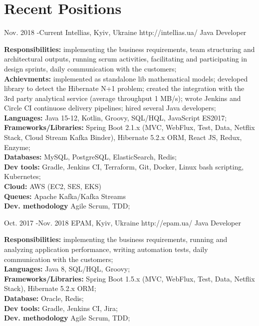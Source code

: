 \documentclass[10pt]{article} %
\begin{document}
\section{Recent Positions}
\job
{Nov. 2018 -}{Current}
{Intellias, Kyiv, Ukraine}
{http://intellias.ua/}
{Java Developer}
{\rule{0mm}{5mm}
\textbf{Responsibilities:}  implementing the business requirements, team structuring and architectural outputs, running scrum activities, facilitating and participating in design sprints, daily communication with the customers;
\\ \textbf{Achievments:} \newline
implemented as standalone lib mathematical models; \newline
 developed library to detect the Hibernate N+1 problem; \newline
 created the integration with the 3rd party analytical service (average throughput 1 MB/s);\newline
 wrote Jenkins and Circle CI continuose delivery pipelines;\newline
 hired several Java developers; 
\\ \textbf{Languages:}  Java 15-12, Kotlin, Groovy,  SQL/HQL, JavaScript ES2017;
\\  \textbf{Frameworks/Libraries:}  Spring Boot 2.1.x (MVC, WebFlux, Test, Data, Netflix Stack, Cloud Stream Kafka Binder), Hibernate 5.2.x ORM, React JS, Redux, Enzyme;
\\ \textbf{Databases:}  MySQL, PostgreSQL, ElasticSearch, Redis;
\\  \textbf{Dev tools:} Gradle, Jenkins CI, Terraform, Git, Docker, Linux bash scripting, Kubernetes;
\\ \textbf{Cloud:} AWS (EC2, SES, EKS)
\\ \textbf{Queues:} Apache Kafka/Kafka Streams
\\  \textbf{Dev. methodology} Agile Scrum, TDD;
 }
 
\job
{Oct. 2017 -}{Nov. 2018}
{EPAM, Kyiv, Ukraine}
{http://epam.ua/}
{Java Developer}
{
\rule{0mm}{5mm}\textbf{Responsibilities:}  implementing the business requirements, running and analyzing application performance, writing automation tests, daily communication with the customers;
\\ \textbf{Languages:}  Java 8, SQL/HQL, Groovy;
\\  \textbf{Frameworks/Libraries:}  Spring Boot 1.5.x (MVC, WebFlux, Test, Data, Netflix Stack), Hibernate 5.2.x ORM;
\\ \textbf{Database:}  Oracle, Redis;
\\  \textbf{Dev tools:} Gradle, Jenkins CI, Jira;
\\  \textbf{Dev. methodology} Agile Scrum, TDD;
 }
\end{document}
